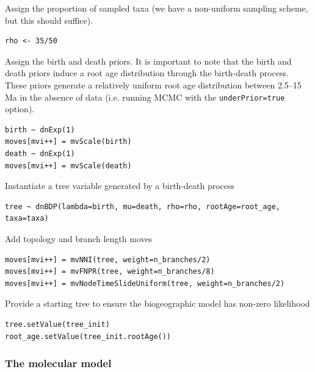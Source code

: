 Assign the proportion of sampled taxa (we have a non-uniform sampling scheme, but this should suffice).

\begin{snugshade}
\begin{lstlisting}
rho <- 35/50
\end{lstlisting}
\end{snugshade}

Assign the birth and death priors.
It is important to note that the birth and death priors induce a root age distribution through the birth-death process.
These priors generate a relatively uniform root age distribution between 2.5--15 Ma in the absence of data (i.e. running MCMC with the {\tt underPrior=true} option).
\begin{snugshade}
\begin{lstlisting}
birth ~ dnExp(1)
moves[mvi++] = mvScale(birth)
death ~ dnExp(1)
moves[mvi++] = mvScale(death)
\end{lstlisting}
\end{snugshade}

Instantiate a tree variable generated by a birth-death process
\begin{snugshade}
\begin{lstlisting}
tree ~ dnBDP(lambda=birth, mu=death, rho=rho, rootAge=root_age, taxa=taxa)
\end{lstlisting}
\end{snugshade}


Add topology and branch length moves
\begin{snugshade}
\begin{lstlisting}
moves[mvi++] = mvNNI(tree, weight=n_branches/2)
moves[mvi++] = mvFNPR(tree, weight=n_branches/8)
moves[mvi++] = mvNodeTimeSlideUniform(tree, weight=n_branches/2)
\end{lstlisting}
\end{snugshade}

Provide a starting tree to ensure the biogeographic model has non-zero likelihood

\begin{snugshade}
\begin{lstlisting}
tree.setValue(tree_init)
root_age.setValue(tree_init.rootAge())
\end{lstlisting}
\end{snugshade}


\subsubsection{The molecular model}

